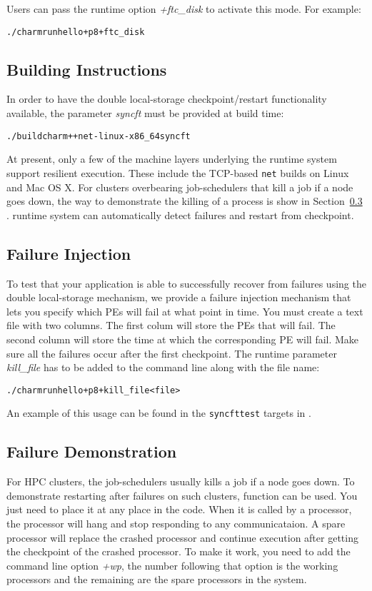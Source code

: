 Users can pass the runtime option {\it +ftc\_disk} to activate this
mode.  For example:

\begin{alltt}
   ./charmrun hello +p8 +ftc_disk
\end{alltt} 

\subsection{Building Instructions}
In order to have the double local-storage checkpoint/restart
functionality available, the parameter \emph{syncft} must be provided
at build time:

\begin{alltt}
   ./build charm++ net-linux-x86_64 syncft
\end{alltt} 

At present, only a few of the machine layers underlying the \charmpp{}
runtime system support resilient execution. These include the
TCP-based \texttt{net} builds on Linux and Mac OS X. For clusters overbearing 
job-schedulers that kill a job if a node goes down, the way to demonstrate the killing 
of a process is show in Section~\ref{ft:inject} . 
\charmpp{} runtime system can automatically detect failures and restart from checkpoint.

\subsection{Failure Injection}
To test that your application is able to successfully recover from
failures using the double local-storage mechanism, we provide a
failure injection mechanism that lets you specify which PEs will fail
at what point in time. You must create a text file with two
columns. The first colum will store the PEs that will fail. The second
column will store the time at which the corresponding PE will
fail. Make sure all the failures occur after the first checkpoint. The
runtime parameter \emph{kill\_file} has to be added to the command
line along with the file name:

\begin{alltt}
   ./charmrun hello +p8 +kill_file <file>
\end{alltt} 

An example of this usage can be found in the \texttt{syncfttest}
targets in .

\subsection{Failure Demonstration}
\label{ft:inject}
For HPC clusters, the job-schedulers usually kills a job if a node goes down. To demonstrate
restarting after failures on such clusters,  function can be used. You just need to place it at any place
in the code. When it is called by a processor, the processor will hang and stop responding to any communicataion.
A spare processor will replace the crashed processor and continue execution after getting the checkpoint of the crashed processor. 
To make it work, you need to add the command line option
\emph{+wp}, the number following that option is the working processors and the remaining 
are the spare processors in the system.
